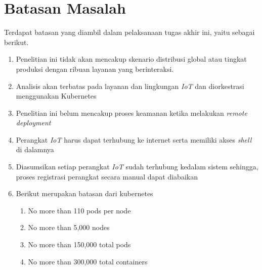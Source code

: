 \section{Batasan Masalah}
\label{sec:batasan-masalah}

Terdapat batasan yang diambil dalam pelaksanaan tugas akhir ini, yaitu sebagai berikut.

\begin{enumerate}
  \item Penelitian ini tidak akan mencakup skenario distribusi global atau tingkat produksi dengan ribuan layanan yang berinteraksi.
  \item Analisis akan terbatas pada layanan dan lingkungan \textit{IoT} dan diorkestrasi \\ menggunakan Kubernetes
  \item Penelitian ini belum mencakup proses keamanan ketika melakukan \textit{remote deployment}
  \item Perangkat \textit{IoT} harus dapat terhubung ke internet serta memiliki akses \textit{shell} di dalamnya
  \item Diasumsikan setiap perangkat \textit{IoT} sudah terhubung kedalam sistem sehingga, proses registrasi perangkat secara manual dapat diabaikan
  \item Berikut merupakan batasan dari kubernetes
        \begin{enumerate}
          \item No more than 110 pods per node
          \item No more than 5,000 nodes
          \item No more than 150,000 total pods
          \item No more than 300,000 total containers
        \end{enumerate}
\end{enumerate}

